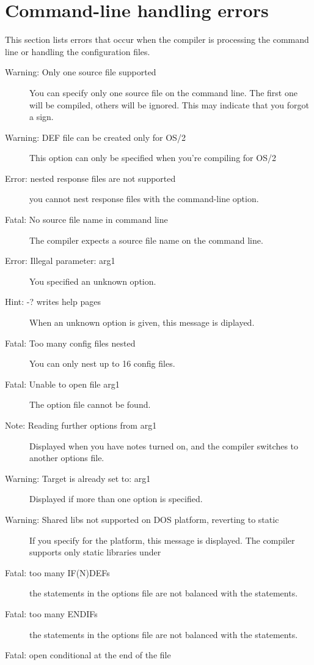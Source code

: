  \section{Command-line handling errors}
 This section lists errors that occur when the compiler is processing the
 command line or handling the configuration files.
 \begin{description}
\item [Warning: Only one source file supported]
 You can specify only one source file on the command line. The first
 one will be compiled, others will be ignored. This may indicate that
 you forgot a  sign.
\item [Warning: DEF file can be created only for OS/2]
 This option can only be specified when you're compiling for OS/2
\item [Error: nested response files are not supported]
 you cannot nest response files with the  command-line option.
\item [Fatal: No source file name in command line]
 The compiler expects a source file name on the command line.
\item [Error: Illegal parameter: arg1]
 You specified an unknown option.
\item [Hint: -? writes help pages]
 When an unknown option is given, this message is diplayed.
\item [Fatal: Too many config files nested]
 You can only nest up to 16 config files.
\item [Fatal: Unable to open file arg1]
 The option file cannot be found.
\item [Note: Reading further options from arg1]
 Displayed when you have notes turned on, and the compiler switches
 to another options file.
\item [Warning: Target is already set to: arg1]
 Displayed if more than one  option is specified.
\item [Warning: Shared libs not supported on DOS platform, reverting to static]
 If you specify  for the \dos platform, this message is displayed.
 The compiler supports only static libraries under \dos
\item [Fatal: too many IF(N)DEFs]
 the  statements in the options file are not balanced with
 the  statements.
\item [Fatal: too many ENDIFs]
 the  statements in the options file are not balanced with
 the  statements.
\item [Fatal: open conditional at the end of the file]

\end{description}
